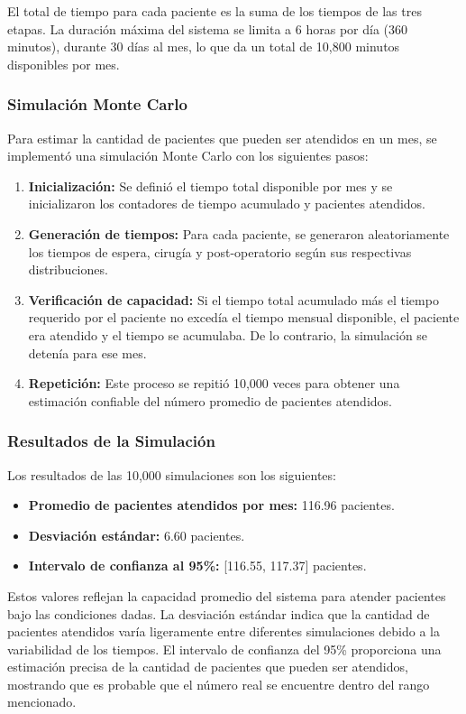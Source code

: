 \documentclass[12pt]{article}
\begin{document}
El total de tiempo para cada paciente es la suma de los tiempos de las tres etapas. La duración máxima del sistema se limita a 6 horas por día (360 minutos), durante 30 días al mes, lo que da un total de 10,800 minutos disponibles por mes.

\subsubsection{Simulación Monte Carlo}
Para estimar la cantidad de pacientes que pueden ser atendidos en un mes, se implementó una simulación Monte Carlo con los siguientes pasos:
\begin{enumerate}
    \item \textbf{Inicialización:} Se definió el tiempo total disponible por mes y se inicializaron los contadores de tiempo acumulado y pacientes atendidos.
    \item \textbf{Generación de tiempos:} Para cada paciente, se generaron aleatoriamente los tiempos de espera, cirugía y post-operatorio según sus respectivas distribuciones.
    \item \textbf{Verificación de capacidad:} Si el tiempo total acumulado más el tiempo requerido por el paciente no excedía el tiempo mensual disponible, el paciente era atendido y el tiempo se acumulaba. De lo contrario, la simulación se detenía para ese mes.
    \item \textbf{Repetición:} Este proceso se repitió 10,000 veces para obtener una estimación confiable del número promedio de pacientes atendidos.
\end{enumerate}

\subsubsection{Resultados de la Simulación}
Los resultados de las 10,000 simulaciones son los siguientes:
\begin{itemize}
    \item \textbf{Promedio de pacientes atendidos por mes:} 116.96 pacientes.
    \item \textbf{Desviación estándar:} 6.60 pacientes.
    \item \textbf{Intervalo de confianza al 95\%:} [116.55, 117.37] pacientes.
\end{itemize}

Estos valores reflejan la capacidad promedio del sistema para atender pacientes bajo las condiciones dadas. La desviación estándar indica que la cantidad de pacientes atendidos varía ligeramente entre diferentes simulaciones debido a la variabilidad de los tiempos. El intervalo de confianza del 95\% proporciona una estimación precisa de la cantidad de pacientes que pueden ser atendidos, mostrando que es probable que el número real se encuentre dentro del rango mencionado.
\end{document}
